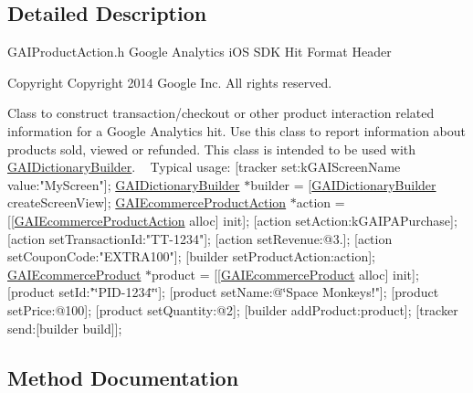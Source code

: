 \subsection{Detailed Description}
G\+A\+I\+Product\+Action.\+h  Google Analytics i\+OS S\+DK Hit Format Header \begin{DoxyCopyright}{Copyright}
Copyright 2014 Google Inc. All rights reserved.
\end{DoxyCopyright}
Class to construct transaction/checkout or other product interaction related information for a Google Analytics hit. Use this class to report information about products sold, viewed or refunded. This class is intended to be used with \hyperlink{interface_g_a_i_dictionary_builder}{G\+A\+I\+Dictionary\+Builder}. ~\newline
 Typical usage\+: {\ttfamily  \mbox{[}tracker set\+:k\+G\+A\+I\+Screen\+Name value\+:"My\+Screen"\mbox{]}; \hyperlink{interface_g_a_i_dictionary_builder}{G\+A\+I\+Dictionary\+Builder} $\ast$builder = \mbox{[}\hyperlink{interface_g_a_i_dictionary_builder}{G\+A\+I\+Dictionary\+Builder} create\+Screen\+View\mbox{]}; \hyperlink{interface_g_a_i_ecommerce_product_action}{G\+A\+I\+Ecommerce\+Product\+Action} $\ast$action = \mbox{[}\mbox{[}\hyperlink{interface_g_a_i_ecommerce_product_action}{G\+A\+I\+Ecommerce\+Product\+Action} alloc\mbox{]} init\mbox{]}; \mbox{[}action set\+Action\+:k\+G\+A\+I\+P\+A\+Purchase\mbox{]}; \mbox{[}action set\+Transaction\+Id\+:"T\+T-\/1234"\mbox{]}; \mbox{[}action set\+Revenue\+:@3.\mbox{]}; \mbox{[}action set\+Coupon\+Code\+:"E\+X\+T\+R\+A100"\mbox{]}; \mbox{[}builder set\+Product\+Action\+:action\mbox{]}; \hyperlink{interface_g_a_i_ecommerce_product}{G\+A\+I\+Ecommerce\+Product} $\ast$product = \mbox{[}\mbox{[}\hyperlink{interface_g_a_i_ecommerce_product}{G\+A\+I\+Ecommerce\+Product} alloc\mbox{]} init\mbox{]}; \mbox{[}product set\+Id\+:"\char`\"{}\+P\+I\+D-\/1234\char`\"{}\char`\"{}\mbox{]};
\mbox{[}product set\+Name\+:@\char`\"{}Space Monkeys!"\mbox{]}; \mbox{[}product set\+Price\+:@100\mbox{]}; \mbox{[}product set\+Quantity\+:@2\mbox{]}; \mbox{[}builder add\+Product\+:product\mbox{]}; \mbox{[}tracker send\+:\mbox{[}builder build\mbox{]}\mbox{]}; } 

\subsection{Method Documentation}
\mbox{\label{interface_g_a_i_ecommerce_product_action_ab5070c54e30543649778dede1145ed33}} 
